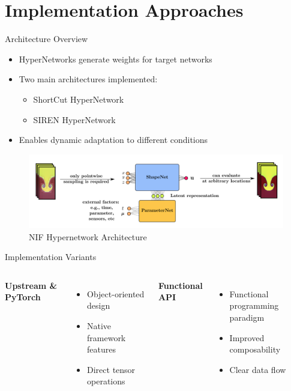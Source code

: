 \documentclass{beamer}
\begin{document}
\section{Implementation Approaches}

\begin{frame}{Architecture Overview}
    \begin{itemize}
        \item HyperNetworks generate weights for target networks
        \item Two main architectures implemented:
        \begin{itemize}
            \item ShortCut HyperNetwork
            \item SIREN HyperNetwork
        \end{itemize}
        \item Enables dynamic adaptation to different conditions
    \end{itemize}
    \begin{figure}
        \includegraphics[width=0.7\linewidth]{hypernetwork_diagram.png}
        \caption{NIF Hypernetwork Architecture}
    \end{figure}
\end{frame}

\begin{frame}{Implementation Variants}
    \begin{columns}
        \textbf{Upstream \& PyTorch}
        \begin{itemize}
            \item Object-oriented design
            \item Native framework features
            \item Direct tensor operations
        \end{itemize}
        
        \textbf{Functional API}
        \begin{itemize}
            \item Functional programming paradigm
            \item Improved composability
            \item Clear data flow
        \end{itemize}
    \end{columns}
\end{frame}
\end{document}
